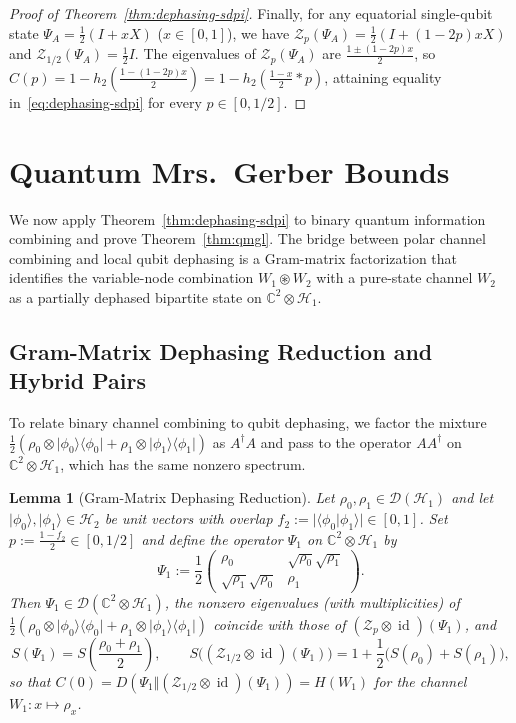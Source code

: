 \documentclass[10pt,a4paper]{article}
\numberwithin{equation}{section}
\theoremstyle{plain}
\newtheorem{lemma}[theorem]{Lemma}
\theoremstyle{definition}
\theoremstyle{remark}
\DeclareMathOperator{\id}{id}
\newcommand{\cH}{\mathcal{H}}
\newcommand{\cD}{\mathcal{D}}
\newcommand{\cZ}{\mathcal{Z}}
\newcommand{\bC}{\mathbb{C}}
\newcommand{\ket}[1]{\lvert #1 \rangle}
\newcommand{\ketbra}[1]{\lvert #1 \rangle\langle #1 \rvert}
\newcommand{\braket}[2]{\langle #1 \vert #2 \rangle}
\begin{document}
\begin{proof}[Proof of Theorem~\ref{thm:dephasing-sdpi}]
Finally, for any equatorial single-qubit state $\Psi_A = \frac{1}{2}(I + xX)$ ($x \in [0,1]$), we have $\cZ_p(\Psi_A) = \frac{1}{2}(I + (1 - 2p)xX)$ and $\cZ_{1/2}(\Psi_A) = \frac{1}{2}I$. The eigenvalues of $\cZ_p(\Psi_A)$ are $\frac{1 \pm (1 - 2p)x}{2}$, so $C(p) = 1 - h_2(\frac{1 - (1 - 2p)x}{2}) = 1 - h_2(\frac{1-x}{2} * p)$, attaining equality in~\eqref{eq:dephasing-sdpi} for every $p \in [0, 1/2]$.
\end{proof}

\section{Quantum Mrs.\ Gerber Bounds}\label{sec:qmgl}

We now apply Theorem~\ref{thm:dephasing-sdpi} to binary quantum information combining and prove Theorem~\ref{thm:qmgl}. The bridge between polar channel combining and local qubit dephasing is a Gram-matrix factorization that identifies the variable-node combination $W_1 \circledast W_2$ with a pure-state channel $W_2$ as a partially dephased bipartite state on $\bC^2 \otimes \cH_1$.

\subsection{Gram-Matrix Dephasing Reduction and Hybrid Pairs}

To relate binary channel combining to qubit dephasing, we factor the mixture $\frac{1}{2}(\rho_0 \otimes \ketbra{\phi_0} + \rho_1 \otimes \ketbra{\phi_1})$ as $A^{\dagger}A$ and pass to the operator $AA^{\dagger}$ on $\bC^2 \otimes \cH_1$, which has the same nonzero spectrum.

\begin{lemma}[Gram-Matrix Dephasing Reduction]\label{lem:gram-dephasing}
Let $\rho_0, \rho_1 \in \cD(\cH_1)$ and let $\ket{\phi_0}, \ket{\phi_1} \in \cH_2$ be unit vectors with overlap $f_2 := \lvert \braket{\phi_0}{\phi_1} \rvert \in [0,1]$. Set $p := \frac{1 - f_2}{2} \in [0, 1/2]$ and define the operator $\Psi_1$ on $\bC^2 \otimes \cH_1$ by
\begin{equation}\label{eq:gram-state}
\Psi_1 := \frac{1}{2}
\begin{pmatrix}
\rho_0 & \sqrt{\rho_0}\sqrt{\rho_1}\\
\sqrt{\rho_1}\sqrt{\rho_0} & \rho_1
\end{pmatrix}.
\end{equation}
Then $\Psi_1 \in \cD(\bC^2 \otimes \cH_1)$, the nonzero eigenvalues (with multiplicities) of $\frac{1}{2}(\rho_0 \otimes \ketbra{\phi_0} + \rho_1 \otimes \ketbra{\phi_1})$ coincide with those of $(\cZ_p \otimes \id)(\Psi_1)$, and
\[
S(\Psi_1) = S\!\left(\frac{\rho_0 + \rho_1}{2}\right), \qquad
S\bigl((\cZ_{1/2} \otimes \id)(\Psi_1)\bigr) = 1 + \frac{1}{2}\bigl(S(\rho_0) + S(\rho_1)\bigr),
\]
so that $C(0) = D(\Psi_1 \Vert (\cZ_{1/2} \otimes \id)(\Psi_1)) = H(W_1)$ for the channel $W_1 : x \mapsto \rho_x$.
\end{lemma}
\end{document}

